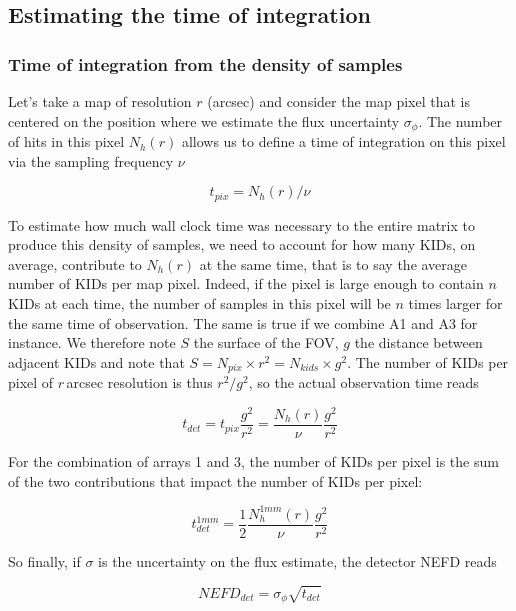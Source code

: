 \subsection{Estimating the time of integration}

\subsubsection{Time of integration from the density of samples}

Let's take a map of resolution $r$ (arcsec) and consider the map pixel that is
centered on the position where we estimate the flux uncertainty
$\sigma_\phi$. The number of hits in this pixel $N_h(r)$ allows us to define a
time of integration on this pixel via the sampling frequency $\nu$

\begin{equation}
t_{pix} = N_h(r)/\nu
\end{equation}

To estimate how much wall clock time was necessary to the entire matrix to
produce this density of samples, we need to account for how many KIDs, on
average, contribute to $N_h(r)$ at the same time, that is to say the average
number of KIDs per map pixel. Indeed, if the pixel is large enough to contain
$n$ KIDs at each time, the number of samples in this pixel will be $n$ times
larger for the same time of observation. The same is true if we combine A1 and
A3 for instance. We therefore note $S$ the surface of the FOV, $g$ the distance
between adjacent KIDs and note that $S = N_{pix} \times r^2 = N_{kids} \times
g^2$. The number of KIDs per pixel of $r$\,arcsec resolution is thus $r^2/g^2$,
so the actual observation time reads

\begin{equation}
t_{det} = t_{pix}\frac{g^2}{r^2} = \frac{N_h(r)}{\nu}\frac{g^2}{r^2}
\end{equation}

For the combination of arrays 1 and 3, the number of KIDs per pixel is the sum
of the two contributions that impact the number of KIDs per pixel:

\begin{equation}
t_{det}^{1mm} = \frac{1}{2}\frac{N^{1mm}_h(r)}{\nu}\frac{g^2}{r^2}
\end{equation}

So finally, if $\sigma$ is the uncertainty on the flux estimate, the detector NEFD reads

\begin{equation}
NEFD_{det} = \sigma_\phi\sqrt{t_{det}}
\label{eq:nefd_t_int}
\end{equation}

